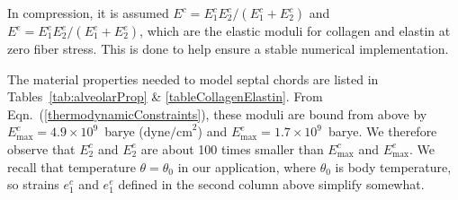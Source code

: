 In compression, it is assumed $E^c = E^c_1 E^c_2 / ( E^c_1 + E^c_2 )$ and $E^e = E^e_1 E^e_2 / ( E^e_1 + E^e_2 )$, which are the elastic moduli for collagen and elastin at zero fiber stress.  This is done to help ensure a stable numerical implementation.

The material properties needed to model septal chords are listed in Tables~\ref{tab:alveolarProp} \& \ref{tableCollagenElastin}.  From Eqn.~(\ref{thermodynamicConstraints}), these moduli are bound from above by $E^c_{\max} = 4.9 \times 10^9$~barye ($\text{dyne/cm}^2$) and $E^e_{\max} = 1.7 \times 10^9$~barye.  We therefore observe that $E^c_2$ and $E^e_2$ are about 100 times smaller than $E^c_{\max}$ and $E^e_{\max}$.  We recall that temperature $\theta = \theta_0$ in our application, where $\theta_0$ is body temperature, so strains $e^c_1$ and $e^e_1$ defined in the second column above simplify somewhat.  


